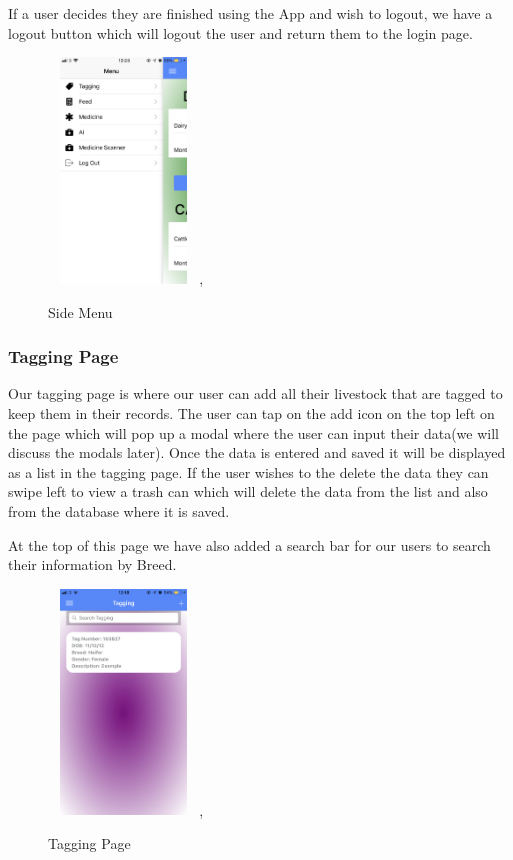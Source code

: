 \documentclass[12pt,a4paper,oneside,openany]{book}
\begin{document}
If a user decides they are finished using the App and wish to logout, we have a logout button which will logout the user and return them to the login page.

\begin{figure}[ht]
\renewcommand\thefigure{5.12}
\centering
\includegraphics[width=4cm,height=6cm]{Images/sideMenu.png},
\caption{Side Menu}
\label{menu}
\end{figure}


\newpage
\subsubsection{Tagging Page}
Our tagging page is where our user can add all their livestock that are tagged to keep them in their records. The user can tap on the add icon on the top left on the page which will pop up a modal where the user can input their data(we will discuss the modals later). Once the data is entered and saved it will be displayed as a list in the tagging page. If the user wishes to the delete the data they can swipe left to view a trash can which will delete the data from the list and also from the database where it is saved.

At the top of this page we have also added a search bar for our users to search their information by Breed.

\begin{figure}[ht]
\renewcommand\thefigure{5.13}
\centering
\includegraphics[width=4cm,height=6cm]{Images/tagging.png},
\caption{Tagging Page}
\label{tagging}
\end{figure}
\end{document}
